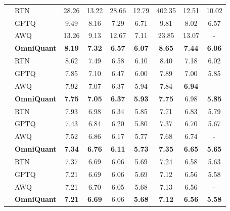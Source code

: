 \documentclass{article} %
\begin{document}
\begin{table}[!ht]
\begin{tabular}{llccccccc}
         \hline
         & RTN & 28.26 & 13.22 & 28.66 & 12.79 & 402.35 & 12.51 & 10.02  \\
         & GPTQ & 9.49 & 8.16 & 7.29 & 6.71 & 9.81 & 8.02 & 6.57  \\
         & AWQ & 13.26 & 9.13 & 12.67 & 7.11 & 23.85 & 13.07 & -  \\
         & \textbf{OmniQuant} & \textbf{8.19} & \textbf{7.32} & \textbf{6.57} & \textbf{6.07} & \textbf{8.65} & \textbf{7.44} & \textbf{6.06}   \\
         \hline
         & RTN & 8.62 & 7.49 & 6.58 & 6.10 & 8.40 & 7.18 & 6.02  \\
         & GPTQ & 7.85 & 7.10 & 6.47 & 6.00 & 7.89 & 7.00 & 5.85  \\
         & AWQ & 7.92 & 7.07 & 6.37 & 5.94 & 7.84 & \textbf{6.94} & -  \\
         & \textbf{OmniQuant}  & \textbf{7.75} & \textbf{7.05} & \textbf{6.37} & \textbf{5.93} & \textbf{7.75} & 6.98 & \textbf{5.85}   \\
         \hline
          & RTN & 7.93 & 6.98 & 6.34 & 5.85 & 7.71 & 6.83 & 5.79  \\
         & GPTQ & 7.43 & 6.84 & 6.20 & 5.80 & 7.37 & 6.70 & 5.67  \\
         & AWQ & 7.52 & 6.86 & 6.17 & 5.77 & 7.68 & 6.74 & -  \\
         & \textbf{OmniQuant}  & \textbf{7.34} & \textbf{6.76} & \textbf{6.11} & \textbf{5.73} & \textbf{7.35} & \textbf{6.65} & \textbf{5.65}   \\
         \hline
          & RTN & 7.37 & 6.69 & 6.06 & 5.69 & 7.24 & 6.58 & 5.63  \\
         & GPTQ & 7.21 & 6.69 & 6.06 & 5.69 & 7.12 & 6.56 & 5.58  \\
         & AWQ & 7.21 & 6.70 & 6.05 & 5.68 & 7.13 & 6.56 & -  \\
         & \textbf{OmniQuant}  & \textbf{7.21} & \textbf{6.69} & 6.06 & \textbf{5.68} & \textbf{7.12} & \textbf{6.56} & \textbf{5.58}   \\
        \hline
    \end{tabular}
\end{table}
\end{document}
